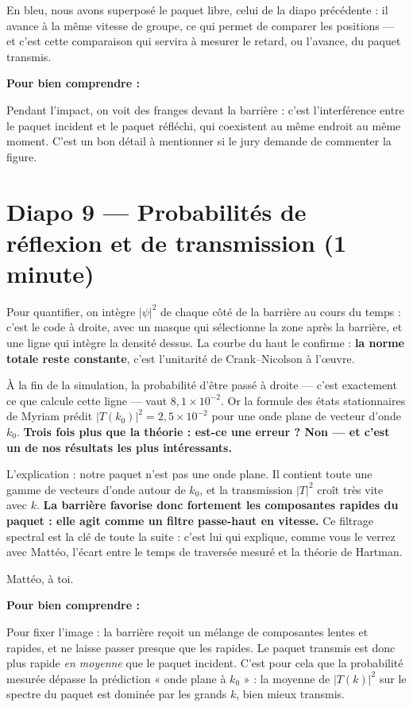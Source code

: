 \documentclass[11pt,a4paper]{article}
\newcommand{\diapo}[2]{\section*{Diapo #1 --- #2}}
\newenvironment{comprendre}%
{\par\medskip\noindent\hrulefill\par\nopagebreak\textbf{Pour bien comprendre :}\itshape\par}%
{\par\nopagebreak\noindent\hrulefill\par\medskip}
\begin{document}
	En bleu, nous avons superposé le paquet libre, celui de la diapo précédente : il
	avance à la même vitesse de groupe, ce qui permet de comparer les positions ---
	et c'est cette comparaison qui servira à mesurer le retard, ou l'avance, du
	paquet transmis.
	
	\begin{comprendre}
		Pendant l'impact, on voit des franges devant la barrière : c'est l'interférence
		entre le paquet incident et le paquet réfléchi, qui coexistent au même endroit au
		même moment. C'est un bon détail à mentionner si le jury demande de commenter la
		figure.
	\end{comprendre}
	
	\diapo{9}{Probabilités de réflexion et de transmission (1 minute)}
	
	Pour quantifier, on intègre $|\psi|^2$ de chaque côté de la barrière au cours du
	temps : c'est le code à droite, avec un masque qui sélectionne la zone après
	la barrière, et une ligne qui intègre la densité dessus. La courbe du haut le
	confirme : \textbf{la norme totale reste constante}, c'est l'unitarité de
	Crank--Nicolson à l'\oe uvre.
	
	À la fin de la simulation, la probabilité d'être passé à droite --- c'est
	exactement ce que calcule cette ligne --- vaut $8{,}1\times10^{-2}$. Or la formule
	des états stationnaires de Myriam prédit
	$|T(k_0)|^2 = 2{,}5\times10^{-2}$ pour une onde plane de vecteur d'onde $k_0$.
	\textbf{Trois fois plus que la théorie : est-ce une erreur ? Non --- et c'est un
		de nos résultats les plus intéressants.}
	
	L'explication : notre paquet n'est pas une onde plane. Il contient toute une
	gamme de vecteurs d'onde autour de $k_0$, et la transmission $|T|^2$ croît très
	vite avec $k$. \textbf{La barrière favorise donc fortement les composantes
		rapides du paquet : elle agit comme un filtre passe-haut en vitesse.} Ce
	filtrage spectral est la clé de toute la suite : c'est lui qui explique, comme
	vous le verrez avec Mattéo, l'écart entre le temps de traversée mesuré et la
	théorie de Hartman.
	
	Mattéo, à toi.
	
	\begin{comprendre}
		Pour fixer l'image : la barrière reçoit un mélange de composantes lentes et
		rapides, et ne laisse passer presque que les rapides. Le paquet transmis est donc
		plus rapide \emph{en moyenne} que le paquet incident. C'est pour cela que la
		probabilité mesurée dépasse la prédiction « onde plane à $k_0$ » : la moyenne de
		$|T(k)|^2$ sur le spectre du paquet est dominée par les grands $k$, bien mieux
		transmis.
	\end{comprendre}
	
\end{document}
